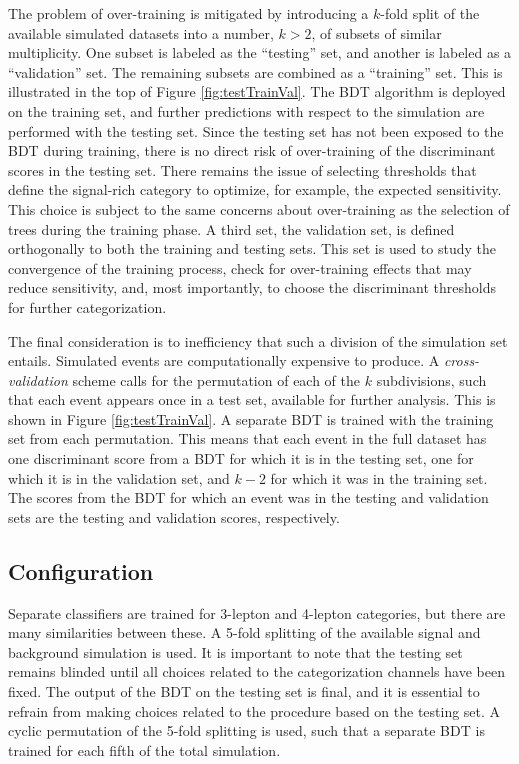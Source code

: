 The problem of over-training is mitigated by introducing a $k$-fold split of the available simulated datasets into a number, $k>2$, of subsets of similar multiplicity.
One subset is labeled as the ``testing'' set, and another is labeled as a ``validation'' set.
The remaining subsets are combined as a ``training'' set.
This is illustrated in the top of Figure \ref{fig:testTrainVal}.
The BDT algorithm is deployed on the training set, and further predictions with respect to the simulation are performed with the testing set.
Since the testing set has not been exposed to the BDT during training, there is no direct risk of over-training of the discriminant scores in the testing set.
There remains the issue of selecting thresholds that define the signal-rich category to optimize, for example, the expected sensitivity.
This choice is subject to the same concerns about over-training as the selection of trees during the training phase. 
A third set, the validation set, is defined orthogonally to both the training and testing sets.
This set is used to study the convergence of the training process, check for over-training effects that may reduce sensitivity, and, most importantly, to choose the discriminant thresholds for further categorization.

The final consideration is to inefficiency that such a division of the simulation set entails.
Simulated events are computationally expensive to produce.
A \emph{cross-validation} scheme calls for the permutation of each of the $k$ subdivisions, such that each event appears once in a test set, available for further analysis.
This is shown in Figure \ref{fig:testTrainVal}.
A separate BDT is trained with the training set from each permutation.
This means that each event in the full dataset has one discriminant score from a BDT for which it is in the testing set, one for which it is in the validation set, and $k-2$ for which it was in the training set.
The scores from the BDT for which an event was in the testing and validation sets are the testing and validation scores, respectively.

\subsection{Configuration}
\label{sec:hmmBdtConfiguration}

Separate classifiers are trained for 3-lepton and 4-lepton categories, but there are many similarities between these.
A 5-fold splitting of the available signal and background simulation is used.
It is important to note that the testing set remains blinded until all choices related to the categorization channels have been fixed.
The output of the BDT on the testing set is final, and it is essential to refrain from making choices related to the procedure based on the testing set.
A cyclic permutation of the 5-fold splitting is used, such that a separate BDT is trained for each fifth of the total simulation.

